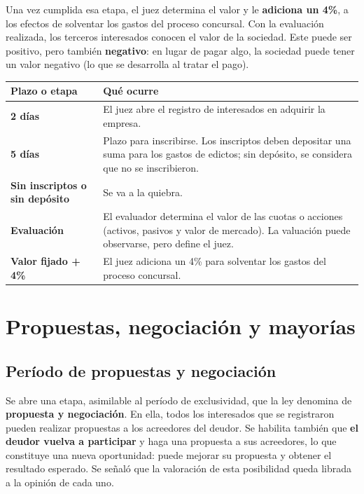 \documentclass[12pt,oneside]{book}
\begin{document}
Una vez cumplida esa etapa, el juez determina el valor y le \textbf{adiciona un 4\%}, a los efectos de solventar los gastos del proceso concursal. Con la evaluación realizada, los terceros interesados conocen el valor de la sociedad. Este puede ser positivo, pero también \textbf{negativo}: en lugar de pagar algo, la sociedad puede tener un valor negativo (lo que se desarrolla al tratar el pago).

\begin{table}[H]
\centering
\small
\begin{tabularx}{\textwidth}{@{}>{\raggedright\arraybackslash}p{3.8cm}Y@{}}
\toprule
\textbf{Plazo o etapa} & \textbf{Qué ocurre} \\
\midrule
\textbf{2 días} & El juez abre el registro de interesados en adquirir la empresa. \\
\textbf{5 días} & Plazo para inscribirse. Los inscriptos deben depositar una suma para los gastos de edictos; sin depósito, se considera que no se inscribieron. \\
\textbf{Sin inscriptos o sin depósito} & Se va a la quiebra. \\
\textbf{Evaluación} & El evaluador determina el valor de las cuotas o acciones (activos, pasivos y valor de mercado). La valuación puede observarse, pero define el juez. \\
\textbf{Valor fijado + 4\%} & El juez adiciona un 4\% para solventar los gastos del proceso concursal. \\
\bottomrule
\end{tabularx}
\end{table}

\section{Propuestas, negociación y mayorías}

\subsection{Período de propuestas y negociación}

Se abre una etapa, asimilable al período de exclusividad, que la ley denomina de \textbf{propuesta y negociación}. En ella, todos los interesados que se registraron pueden realizar propuestas a los acreedores del deudor. Se habilita también que \textbf{el deudor vuelva a participar} y haga una propuesta a sus acreedores, lo que constituye una nueva oportunidad: puede mejorar su propuesta y obtener el resultado esperado. Se señaló que la valoración de esta posibilidad queda librada a la opinión de cada uno.
\end{document}
